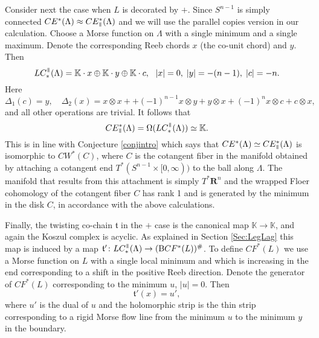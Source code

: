 \documentclass{gtpart}
\newcommand{\K}{\mathbb{K}}
\renewcommand{\t}{\mathfrak{t}}
\renewcommand{\Bar}{\mathrm{B}}
\renewcommand{\R}{\mathbf{R}}
\renewcommand{\parallel}{{\mkern3mu\vphantom{\perp}\vrule depth 0pt\mkern2mu\vrule depth
0pt\mkern3mu}}
\begin{document}
Consider next the case when $L$ is decorated by $+$. Since $S^{n-1}$ is simply connected $CE^{\ast}(\Lambda)\approx CE^{\ast}_{\parallel}(\Lambda)$ and we will use the parallel copies version in our calculation. Choose a Morse function on $\Lambda$ with a single minimum and a single maximum. Denote the corresponding Reeb chords $x$ (the co-unit chord) and $y$. Then
\[ 
LC_{\ast}^{\parallel}(\Lambda)= 
\mathbb{K}\cdot x \oplus \mathbb{K}\cdot y\oplus \mathbb{K} \cdot c, \ \ |x|=0,\;|y|=-(n-1),\;|c|=-n. 
\]
Here 
\[ 
\Delta_{1}(c)=y,\quad \Delta_{2}(x)=x\otimes x + +(-1)^{n-1}x\otimes y + y\otimes x + (-1)^{n}x\otimes c + c\otimes x,
\]
and all other operations are trivial. It follows that
\[ 
CE^{\ast}_{\parallel}(\Lambda)=\Omega(LC_{\ast}^{\parallel}(\Lambda)) \simeq \mathbb{K}.
\]
This is in line with Conjecture \ref{conjintro} which says that
$CE^{\ast}(\Lambda)\simeq CE^{\ast}_{\parallel}(\Lambda)$ is isomorphic to $CW^{\ast}(C)$, where $C$ is the cotangent fiber in the manifold obtained by attaching a cotangent end $T^{\ast}(S^{n-1}\times[0,\infty))$ to the ball along $\Lambda$. The manifold that results from this attachment is simply $T^{\ast}\R^{n}$ and the wrapped Floer cohomology of the cotangent fiber $C$ has rank 1 and is generated by the minimum in the disk $C$, in accordance with the above calculations.

Finally, the twisting co-chain $\t$ in the $+$ case is the canonical map $\K\to\K$, and again the
Koszul complex is acyclic. As explained in Section \ref{Sec:LegLag} this map is induced by a map
$\t'\colon LC_{\ast}^{\parallel}(\Lambda)\to (\Bar{CF^{\ast}(L)})^{\#}$. To define $CF^{\ast}(L)$ we use a Morse function on $L$ with a single local minimum and which is increasing in the end corresponding to a shift in the positive Reeb direction. Denote the generator of $CF^{\ast}(L)$ corresponding to the minimum $u$, $|u|=0$. Then  
\[ 
\t'(x)=u',
\] 
where $u'$ is the dual of $u$ and the holomorphic strip is the thin strip corresponding to a rigid Morse flow line from the minimum $u$ to the minimum $y$ in the boundary.  
\end{document}
